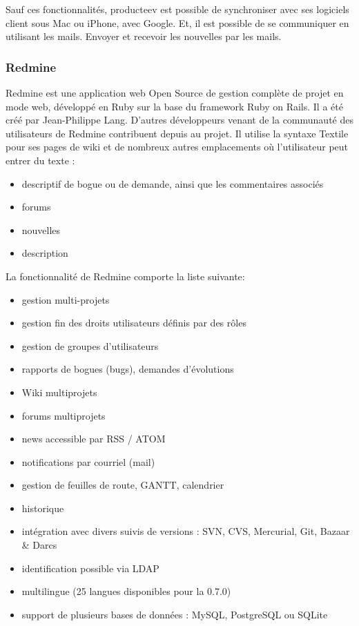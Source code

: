 Sauf ces fonctionnalités, producteev est possible de synchroniser avec ses logiciels client sous Mac ou iPhone, avec Google. Et, il est possible de se communiquer en utilisant les mails. Envoyer et recevoir les nouvelles par les mails. 


\subsubsection{Redmine} %
\label{ssub:redmine}


Redmine est une application web Open Source de gestion complète de projet en mode web, développé en Ruby sur la base du framework Ruby on Rails.
Il a été créé par Jean-Philippe Lang. D'autres développeurs venant de la communauté des utilisateurs de Redmine contribuent depuis au projet. Il utilise la syntaxe Textile pour ses pages de wiki et de nombreux autres emplacements où l'utilisateur peut entrer du texte : 
\begin{itemize}
	\item descriptif de bogue ou de demande, ainsi que les commentaires associés
	\item forums
	\item nouvelles
	\item description
\end{itemize}

La fonctionnalité de Redmine comporte la liste suivante:
\begin{itemize}
	\item gestion multi-projets
	\item gestion fin des droits utilisateurs définis par des rôles
	\item gestion de groupes d'utilisateurs
	\item rapports de bogues (bugs), demandes d'évolutions
	\item Wiki multiprojets
	\item forums multiprojets
	\item news accessible par RSS / ATOM
	\item notifications par courriel (mail)
	\item gestion de feuilles de route, GANTT, calendrier
	\item historique
	\item intégration avec divers suivis de versions : SVN, CVS, Mercurial, Git, Bazaar \& Darcs
	\item identification possible via LDAP
	\item multilingue (25 langues disponibles pour la 0.7.0)
	\item support de plusieurs bases de données : MySQL, PostgreSQL ou SQLite
\end{itemize}

